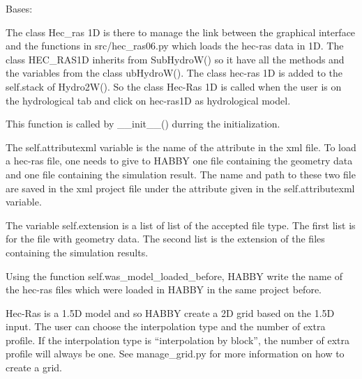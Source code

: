 \documentclass[letterpaper,10pt,english]{sphinxmanual}
\begin{document}
\begin{fulllineitems}
\label{\detokenize{index:src_GUI.hydro_GUI_2.HEC_RAS1D}}
Bases: {\hyperref[\detokenize{index:src_GUI.hydro_GUI_2.SubHydroW}]{}}

The class Hec\_ras 1D is there to manage the link between the graphical interface and the functions in
src/hec\_ras06.py which loads the hec-ras data in 1D. The class HEC\_RAS1D inherits from SubHydroW() so it have all
the methods and the variables from the class ubHydroW(). The class hec-ras 1D is added to the self.stack of Hydro2W(). So the class Hec-Ras 1D is called when
the user is on the hydrological tab and click on hec-ras1D as hydrological model.

\begin{fulllineitems}
\label{\detokenize{index:src_GUI.hydro_GUI_2.HEC_RAS1D.init_iu}}
This function is called by \_\_init\_\_() durring the initialization.


The self.attributexml variable is the name of the attribute in the xml file. To load a hec-ras file, one needs
to give to HABBY one file containing the geometry data and one file containing the simulation result. The name
and path to  these two file are saved in the xml project file under the attribute given in
the self.attributexml variable.

The variable self.extension is a list of list of the accepted file type. The first list is for the file
with geometry data. The second list is the extension of the files containing the simulation results.

Using the function self.was\_model\_loaded\_before, HABBY write the name of the hec-ras files which were loaded
in HABBY in the same project before.

Hec-Ras is a 1.5D model and so HABBY create a 2D grid based on the 1.5D input. The user can choose the interpolation
type and the number of extra profile. If the interpolation type is “interpolation by block”, the number of extra
profile will always be one. See manage\_grid.py for more information on how to create a grid.

\end{fulllineitems}


\end{fulllineitems}
\end{document}
